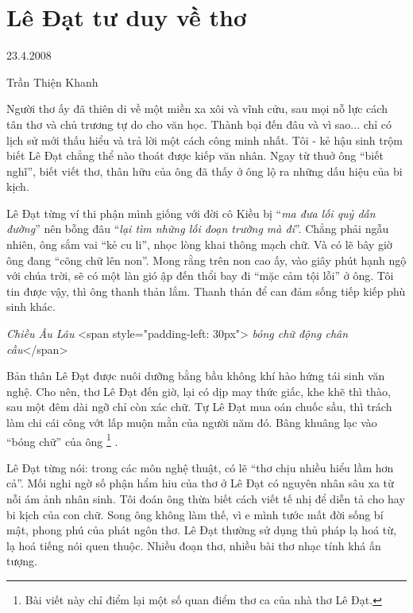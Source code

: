 \documentclass[../main.tex]{subfiles}
\begin{document}
\chapter{Lê Đạt tư duy về thơ}

\begin{metadata}

\begin{flushright}23.4.2008\end{flushright}

Trần Thiện Khanh



\end{metadata}

\begin{multicols}{2}

Người thơ ấy đã thiên di về một miền xa xôi và vĩnh cửu, sau mọi nỗ lực cách tân thơ và chủ trương tự do cho văn học. Thành bại đến đâu và vì sao... chỉ có lịch sử mới thấu hiểu và trả lời một cách công minh nhất. Tôi - kẻ hậu sinh trộm biết Lê Đạt chẳng thể nào thoát được kiếp văn nhân. Ngay từ thuở ông “biết nghĩ”, biết viết thơ, thân hữu của ông đã thấy ở ông lộ ra những dấu hiệu của bi kịch. 
 
Lê Đạt  từng ví thi phận mình giống với đời cô Kiều bị “\textit{ma đưa lối quỷ dẫn đường}” nên bỗng đâu “\textit{lại tìm những lối đoạn trường mà đi}”. Chẳng phải ngẫu nhiên, ông sắm vai “kẻ cu li”, nhọc lòng khai thông mạch chữ. Và có lẽ bây giờ ông đang “cõng chữ lên non”. Mong rằng trên non cao ấy, vào giây phút hạnh ngộ với chúa trời, sẽ có một làn gió ập đến thổi bay đi “mặc cảm tội lỗi” ở ông. Tôi tin được vậy, thì ông thanh thản lắm. Thanh thản để can đảm sống tiếp kiếp phù sinh khác.        
\begin{blockquote}
 
\textit{Chiều Âu Lâu } 
<span style="padding-left: 30px">\textit{                      bóng chữ động chân cầu}</span> 

\end{blockquote}
 
Bản thân Lê Đạt được nuôi dưỡng bằng bầu không khí hào hứng tái sinh văn nghệ. Cho nên, thơ Lê Đạt đến giờ, lại có dịp may thức giấc, khe khẽ thì thào, sau một đêm dài ngỡ chỉ còn xác chữ. Tự Lê Đạt mua oán chuốc sầu, thì trách làm chi cái công vớt lấp muộn mằn của người năm đó. Bâng khuâng lạc vào “bóng chữ” của ông \footnote{
Bài viết này chỉ điểm lại một số quan điểm thơ ca của nhà thơ Lê Đạt.} . 
 
Lê Đạt từng nói: trong các môn nghệ thuật, có lẽ “thơ chịu nhiều hiểu lầm hơn cả”. Mối nghi ngờ số phận hẩm hiu của thơ ở Lê Đạt có nguyên nhân sâu xa từ nỗi ám ảnh nhân sinh. Tôi đoán ông thừa biết cách viết tế nhị để diễn tả cho hay bi kịch của con chữ. Song ông không làm thế, vì e mình tước mất đời sống bí mật, phong phú của phát ngôn thơ. Lê Đạt thường sử dụng thủ pháp lạ hoá từ, lạ hoá tiếng nói quen thuộc. Nhiều đoạn thơ, nhiều bài thơ nhạc tính khá ấn tượng.          
\begin{blockquote}
 

\end{blockquote}
\end{multicols}
\end{document}
